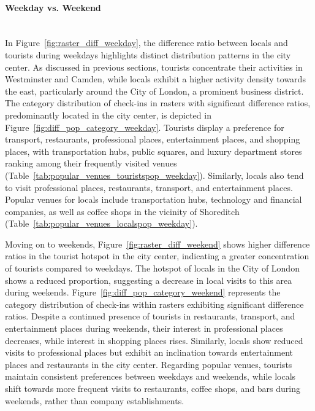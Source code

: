 \documentclass{article}
\newcommand{\subsubsubsection}[1]{\paragraph{#1}\mbox{}\\}
\theoremstyle{definition}
\theoremstyle{remark}
\begin{document}
\subsubsubsection{Weekday vs. Weekend}
In Figure~\ref{fig:raster_diff_weekday}, the difference ratio between locals and tourists during weekdays highlights distinct distribution patterns in the city center. As discussed in previous sections, tourists concentrate their activities in Westminster and Camden, while locals exhibit a higher activity density towards the east, particularly around the City of London, a prominent business district. The category distribution of check-ins in rasters with significant difference ratios, predominantly located in the city center, is depicted in Figure~\ref{fig:diff_pop_category_weekday}. Tourists display a preference for transport, restaurants, professional places, entertainment places, and shopping places, with transportation hubs, public squares, and luxury department stores ranking among their frequently visited venues (Table~\ref{tab:popular_venues_touristspop_weekday}). Similarly, locals also tend to visit professional places, restaurants, transport, and entertainment places. Popular venues for locals include transportation hubs, technology and financial companies, as well as coffee shops in the vicinity of Shoreditch (Table~\ref{tab:popular_venues_localspop_weekday}).


Moving on to weekends, Figure~\ref{fig:raster_diff_weekend} shows higher difference ratios in the tourist hotspot in the city center, indicating a greater concentration of tourists compared to weekdays. The hotspot of locals in the City of London shows a reduced proportion, suggesting a decrease in local visits to this area during weekends. Figure~\ref{fig:diff_pop_category_weekend} represents the category distribution of check-ins within rasters exhibiting significant difference ratios. Despite a continued presence of tourists in restaurants, transport, and entertainment places during weekends, their interest in professional places decreases, while interest in shopping places rises. Similarly, locals show reduced visits to professional places but exhibit an inclination towards entertainment places and restaurants in the city center. Regarding popular venues, tourists maintain consistent preferences between weekdays and weekends, while locals shift towards more frequent visits to restaurants, coffee shops, and bars during weekends, rather than company establishments.
\end{document}
